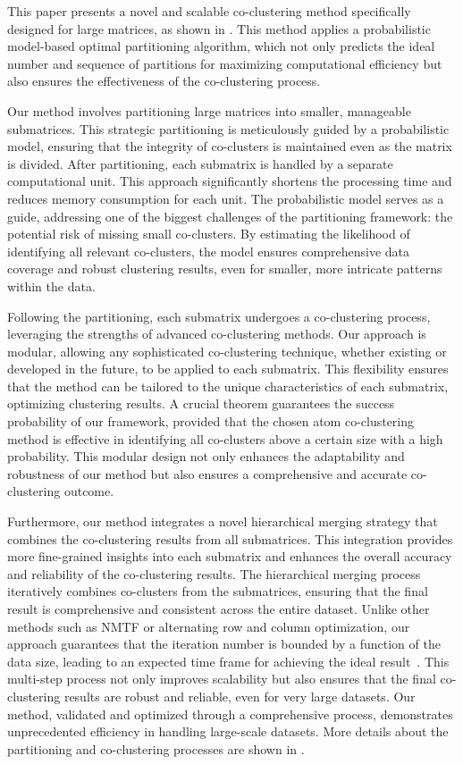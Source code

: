 \documentclass[journal]{IEEEtran}
\renewcommand{\cite}[1]{~\autocite{#1}}
\begin{document}
This paper presents a novel and scalable co-clustering method specifically designed for large matrices, as shown in . This method applies a probabilistic model-based optimal partitioning algorithm, which not only predicts the ideal number and sequence of partitions for maximizing computational efficiency but also ensures the effectiveness of the co-clustering process.

Our method involves partitioning large matrices into smaller, manageable submatrices. This strategic partitioning is meticulously guided by a probabilistic model, ensuring that the integrity of co-clusters is maintained even as the matrix is divided. After partitioning, each submatrix is handled by a separate computational unit. This approach significantly shortens the processing time and reduces memory consumption for each unit. The probabilistic model serves as a guide, addressing one of the biggest challenges of the partitioning framework: the potential risk of missing small co-clusters. By estimating the likelihood of identifying all relevant co-clusters, the model ensures comprehensive data coverage and robust clustering results, even for smaller, more intricate patterns within the data.

Following the partitioning, each submatrix undergoes a co-clustering process, leveraging the strengths of advanced co-clustering methods. Our approach is modular, allowing any sophisticated co-clustering technique, whether existing or developed in the future, to be applied to each submatrix. This flexibility ensures that the method can be tailored to the unique characteristics of each submatrix, optimizing clustering results. A crucial theorem guarantees the success probability of our framework, provided that the chosen atom co-clustering method is effective in identifying all co-clusters above a certain size with a high probability. This modular design not only enhances the adaptability and robustness of our method but also ensures a comprehensive and accurate co-clustering outcome.

Furthermore, our method integrates a novel hierarchical merging strategy that combines the co-clustering results from all submatrices. This integration provides more fine-grained insights into each submatrix and enhances the overall accuracy and reliability of the co-clustering results. The hierarchical merging process iteratively combines co-clusters from the submatrices, ensuring that the final result is comprehensive and consistent across the entire dataset. Unlike other methods such as NMTF or alternating row and column optimization, our approach guarantees that the iteration number is bounded by a function of the data size, leading to an expected time frame for achieving the ideal result\cite{wang2011FastNonnegativeMatrix}. This multi-step process not only improves scalability but also ensures that the final co-clustering results are robust and reliable, even for very large datasets. Our method, validated and optimized through a comprehensive process, demonstrates unprecedented efficiency in handling large-scale datasets.
More details about the partitioning and co-clustering processes are shown in .
\end{document}
